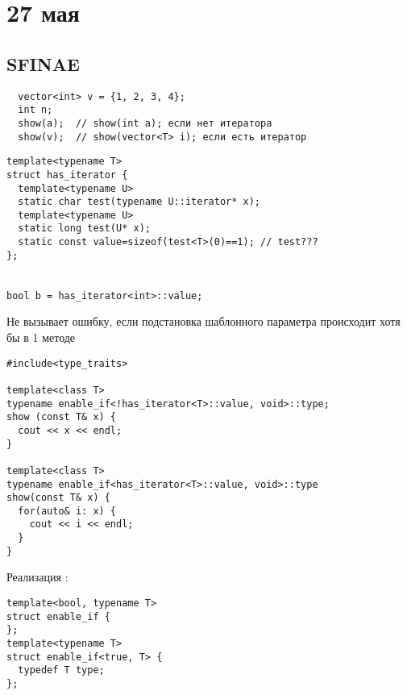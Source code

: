 \section{27 мая}

\subsection{SFINAE}

\begin{verbatim}
  vector<int> v = {1, 2, 3, 4};
  int n;
  show(a);  // show(int a); если нет итератора
  show(v);  // show(vector<T> i); если есть итератор
\end{verbatim}

\begin{verbatim}
template<typename T>
struct has_iterator {
  template<typename U>
  static char test(typename U::iterator* x);
  template<typename U>
  static long test(U* x);
  static const value=sizeof(test<T>(0)==1); // test???
};


bool b = has_iterator<int>::value;
\end{verbatim}
Не вызывает ошибку, если подстановка шаблонного параметра происходит хотя бы в 1 методе

\begin{verbatim}
#include<type_traits>

template<class T>
typename enable_if<!has_iterator<T>::value, void>::type;
show (const T& x) {
  cout << x << endl;
}

template<class T>
typename enable_if<has_iterator<T>::value, void>::type
show(const T& x) {
  for(auto& i: x) {
    cout << i << endl;
  }
}
\end{verbatim}

Реализация :
\begin{verbatim}
template<bool, typename T>
struct enable_if {
};
template<typename T>
struct enable_if<true, T> {
  typedef T type;
};
\end{verbatim}

